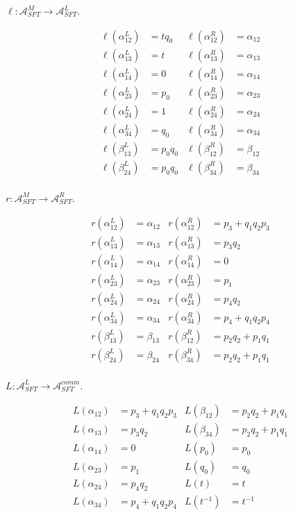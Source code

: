 \documentclass[a4paper,final, reqno]{amsart}
\theoremstyle{plain}
\theoremstyle{definition}
\newcommand{\A}{\mathcal{A}}
\begin{document}
		
		$\ell: \A^M_{SFT} \to \A^L_{SFT}$.
		
		\begin{align*}
			\ell(\alpha_{12}^L) &= tq_0 & \ell(\alpha_{12}^R) &= \alpha_{12} \\
			\ell(\alpha_{13}^L) &= t & \ell(\alpha_{13}^R) &= \alpha_{13} \\
			\ell(\alpha_{14}^L) &= 0 & \ell(\alpha_{14}^R) &= \alpha_{14} \\
			\ell(\alpha_{23}^L) &= p_0 & \ell(\alpha_{23}^R) &= \alpha_{23} \\
			\ell(\alpha_{24}^L) &= 1 & \ell(\alpha_{24}^R) &= \alpha_{24} \\
			\ell(\alpha_{34}^L) &= q_0 & \ell(\alpha_{34}^R) &= \alpha_{34} \\
			\ell(\beta_{13}^L) &= p_0q_0 & \ell(\beta_{12}^R) &= \beta_{12} \\
			\ell(\beta_{24}^L) &= p_0q_0 & \ell(\beta_{34}^R) &= \beta_{34} \\	
		\end{align*}
		
		
		$r: \A^M_{SFT} \to \A^R_{SFT}$.
		
		\begin{align*}
			r(\alpha_{12}^L) &= \alpha_{12} & r(\alpha_{12}^R) &= p_3+q_1q_2p_3 \\
			r(\alpha_{13}^L) &= \alpha_{13} & r(\alpha_{13}^R) &= p_3q_2 \\
			r(\alpha_{14}^L) &= \alpha_{14} & r(\alpha_{14}^R) &= 0 \\
			r(\alpha_{23}^L) &= \alpha_{23} & r(\alpha_{23}^R) &= p_1 \\
			r(\alpha_{24}^L) &= \alpha_{24} & r(\alpha_{24}^R) &= p_4q_2 \\
			r(\alpha_{34}^L) &= \alpha_{34} & r(\alpha_{34}^R) &= p_4+q_1q_2p_4 \\
			r(\beta_{13}^L) &= \beta_{13} & r(\beta_{12}^R) &= p_2q_2+p_1q_1 \\
			r(\beta_{24}^L) &= \beta_{24} & r(\beta_{34}^R) &= p_2q_2+p_1q_1 \\	
		\end{align*}
		
		$L: \A^L_{SFT} \to \A_{SFT}^{comm}$.
		
		\begin{align*}
			L(\alpha_{12}) &= p_3+q_1q_2p_3 & L(\beta_{12}) &= p_2q_2+p_1q_1\\
			L(\alpha_{13}) &= p_3q_2 & L(\beta_{34}) &= p_2q_2+p_1q_1\\
			L(\alpha_{14}) &= 0 & L(p_0)&=p_0  \\
			L(\alpha_{23}) &= p_1 & L(q_0)&=q_0\\
			L(\alpha_{24}) &= p_4q_2 & L(t) &= t\\
			L(\alpha_{34}) &= p_4+q_1q_2p_4 & L(t^{-1}) &= t^{-1}\\
		\end{align*}
		
\end{document}
